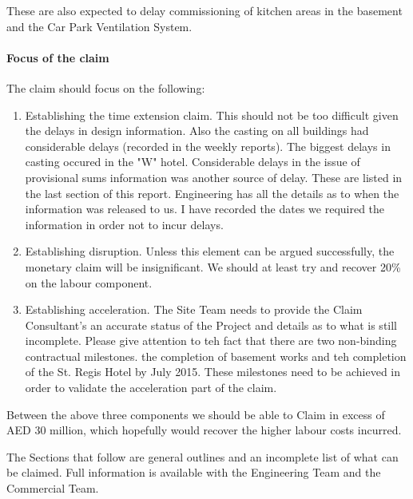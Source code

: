 These are also expected to delay commissioning of kitchen areas in the basement and the Car Park Ventilation System.

\paragraph{Focus of the claim}

The claim should focus on the following:

\begin{enumerate}
\item Establishing the time extension claim. This should not be too difficult given the delays in design information. Also the casting on all buildings had considerable delays (recorded in the weekly  reports). The biggest delays in casting occured in the "W" hotel. Considerable delays in the issue of provisional sums information was another source of delay. These are listed in the last section of this report. Engineering has all the details as to when the information was released to us. I have recorded the dates we required the information in order not to incur delays.

\item Establishing disruption. Unless this element can be argued successfully, the monetary claim will be insignificant. We should at least try and recover 20\% on the labour component.

\item Establishing acceleration. The Site Team needs to provide the Claim Consultant's an accurate status of the Project and details as to what is still incomplete. Please give attention to teh fact that there are two  non-binding contractual milestones. the completion of basement works and teh completion of the St. Regis Hotel by July 2015. These milestones need to be achieved in order to validate the acceleration part of the claim.
\end{enumerate}

Between the above three components we should be able to Claim in excess of  AED 30 million, which hopefully would recover the higher labour costs incurred.

The Sections that follow are general outlines and an incomplete list of what can be claimed. 
Full information is available with the Engineering Team and the Commercial Team.

\setcounter{chapter}{0}





